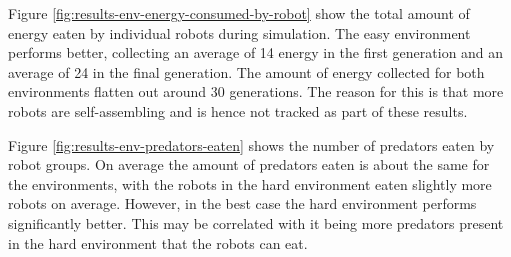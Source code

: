 
Figure \ref{fig:results-env-energy-consumed-by-robot} show the total amount of energy eaten by individual robots during simulation.
The easy environment performs better, collecting an average of 14 energy in the first generation and an average of 24 in the final generation.
The amount of energy collected for both environments flatten out around 30 generations.
The reason for this is that more robots are self-assembling and is hence not tracked as part of these results.

\vspace*{\fill}
\newpage
\vspace*{\fill}


Figure \ref{fig:results-env-predators-eaten} shows the number of predators eaten by robot groups.
On average the amount of predators eaten is about the same for the environments, with the robots in the hard environment eaten slightly more robots on average.
However, in the best case the hard environment performs significantly better. 
This may be correlated with it being more predators present in the hard environment that the robots can eat.
\vspace*{\fill}
